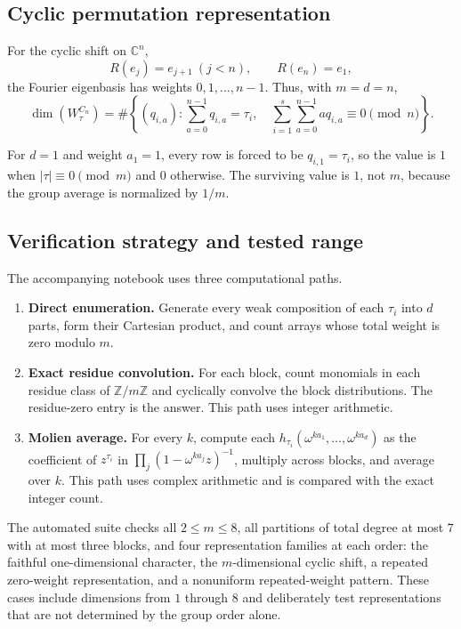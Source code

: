 \documentclass[10pt]{article}
\newcommand{\C}{\mathbb C}
\newcommand{\Z}{\mathbb Z}
\begin{document}
\subsection{Cyclic permutation representation}

For the cyclic shift on $\C^n$,
\[
 R(e_j)=e_{j+1}\ (j<n),\qquad R(e_n)=e_1,
\]
the Fourier eigenbasis has weights $0,1,\ldots,n-1$. Thus, with $m=d=n$,
\[
 \dim(W_\tau^{C_n})=
 \#\left\{(q_{i,a}):
 \sum_{a=0}^{n-1}q_{i,a}=\tau_i,\quad
 \sum_{i=1}^{s}\sum_{a=0}^{n-1}a q_{i,a}\equiv0\pmod n
 \right\}.
\]

For $d=1$ and weight $a_1=1$, every row is forced to be
$q_{i,1}=\tau_i$, so the value is $1$ when $|\tau|\equiv0\pmod m$ and $0$
otherwise. The surviving value is $1$, not $m$, because the group average is
normalized by $1/m$.

\subsection{Verification strategy and tested range}

The accompanying notebook uses three computational paths.

\begin{enumerate}
\item \textbf{Direct enumeration.} Generate every weak composition of each
$\tau_i$ into $d$ parts, form their Cartesian product, and count arrays whose
total weight is zero modulo $m$.
\item \textbf{Exact residue convolution.} For each block, count monomials in
each residue class of $\Z/m\Z$ and cyclically convolve the block distributions.
The residue-zero entry is the answer. This path uses integer arithmetic.
\item \textbf{Molien average.} For every $k$, compute each
$h_{\tau_i}(\omega^{ka_1},\ldots,\omega^{ka_d})$ as the coefficient of
$z^{\tau_i}$ in $\prod_j(1-\omega^{ka_j}z)^{-1}$, multiply across blocks, and
average over $k$. This path uses complex arithmetic and is compared with the
exact integer count.
\end{enumerate}

The automated suite checks all $2\leq m\leq8$, all partitions of total degree
at most $7$ with at most three blocks, and four representation families at
each order: the faithful one-dimensional character, the $m$-dimensional
cyclic shift, a repeated zero-weight representation, and a nonuniform
repeated-weight pattern. These cases include dimensions from $1$ through $8$
and deliberately test representations that are not determined by the group
order alone.
\end{document}
